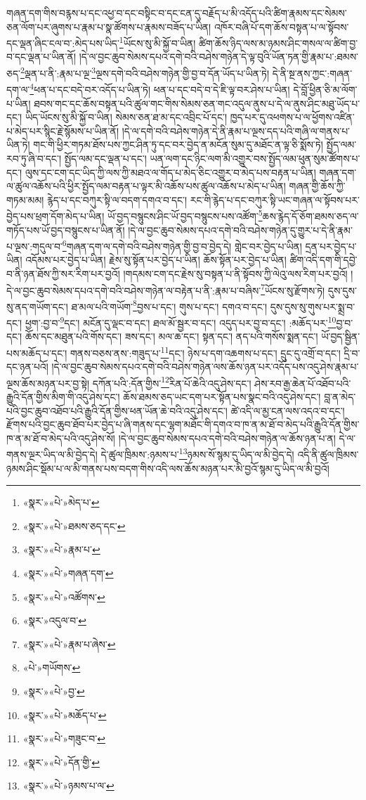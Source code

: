 གཞན་དག་གིས་བརྙས་པ་དང་འཕྱ་བ་དང་བསྟིང་བ་དང་ངན་དུ་བརྗོད་པ་མི་འདོད་པའི་ཚིག་རྣམས་དང་སེམས་ཅན་ལོག་པར་ཞུགས་པ་རྣམ་པ་སྣ་ཚོགས་པ་རྣམས་བཟོད་པ་ཡིན། འཁོར་བཞི་པོ་དག་ཆོས་བསྟན་པ་ལ་སྟོབས་དང་ལྡན་ཞིང་ངལ་བ་:མེད་པས་ཡིད་\footnote{«སྣར་»«པེ་»མེད་པ་}ཡོངས་སུ་མི་སྐྱོ་བ་ཡིན། ཚིག་ཆོས་ཉིད་ལས་མ་ཉམས་ཤིང་གསལ་ལ་ཚིག་བྱ་བ་དང་ལྡན་པ་ཡིན་ནོ། །དེ་ལ་བྱང་ཆུབ་སེམས་དཔའ་དགེ་བའི་བཤེས་གཉེན་དེ་ལྟ་བུའི་ཡོན་ཏན་གྱི་རྣམ་པ་:ཐམས་ཅད་\footnote{«སྣར་»«པེ་»ཐམས་ཅད་དང་}ལྡན་པ་ནི་:རྣམ་པ་ལྔ་\footnote{«སྣར་»«པེ་»རྣམ་པ་}ལྔས་དགེ་བའི་བཤེས་གཉེན་གྱི་བྱ་བ་དོན་ཡོད་པ་ཡིན་ཏེ། དེ་ནི་སྔ་ནས་ཀྱང་:གཞན་དག་ལ་\footnote{«སྣར་»«པེ་»གཞན་དག་}ཕན་པ་དང་བདེ་བར་འདོད་པ་ཡིན་ཏེ། ཕན་པ་དང་བདེ་བ་དེ་ཇི་ལྟ་བར་ཤེས་པ་ཡིན། དེ་བློ་ཕྱིན་ཅི་མ་ལོག་པ་ཡིན། ཐབས་གང་དང་ཆོས་བསྟན་པའི་ཚུལ་གང་གིས་སེམས་ཅན་གང་འདུལ་ནུས་པ་དེ་ལ་ནུས་ཤིང་མཐུ་ཡོད་པ་དང་། ཡིད་ཡོངས་སུ་མི་སྐྱོ་བ་ཡིན། སེམས་ཅན་ཐ་མ་དང་འབྲིང་པོ་དང་། ཁྱད་པར་དུ་འཕགས་པ་ལ་ཕྱོགས་འཛིན་པ་མེད་པར་སྙིང་རྗེ་སྙོམས་པ་ཡིན་ནོ། །དེ་ལ་དགེ་བའི་བཤེས་གཉེན་དེ་ནི་རྣམ་པ་ལྔས་དད་པའི་གཞི་ལ་གནས་པ་ཡིན་ཏེ། གང་གི་ཕྱིར་གཏམ་ཐོས་པས་ཀྱང་ཤིན་ཏུ་དང་བར་བྱེད་ན་མངོན་སུམ་དུ་མཐོང་ན་ལྟ་ཅི་སྨོས་ཏེ། སྤྱོད་ལམ་རབ་ཏུ་ཞི་བ་དང་། སྤྱོད་ལམ་དང་ལྡན་པ་དང་། ཡན་ལག་དང་ཉིང་ལག་མི་འགྱུར་བས་སྤྱོད་ལམ་ཕུན་སུམ་ཚོགས་པ་དང་། ལུས་དང་ངག་དང་ཡིད་ཀྱི་ལས་ཀྱི་མཐའ་ལ་གོད་པ་མེད་ཅིང་འགྱུར་བ་མེད་པས་བརྟན་པ་ཡིན། གཞན་དག་ལ་ཚུལ་འཆོས་པའི་ཕྱིར་སྤྱོད་ལམ་བརྟན་པ་ལྟར་མི་འཆོས་པས་ཚུལ་འཆོས་པ་མེད་པ་ཡིན། གཞན་གྱི་ཆོས་ཀྱི་གཏམ་མམ། རྙེད་པ་དང་བཀུར་སྟི་ལ་བདག་དགའ་བ་དང་། རང་གི་རྙེད་པ་དང་བཀུར་སྟི་ཡང་གཞན་ལ་སྟོབས་པར་བྱེད་པས་ཕྲག་དོག་མེད་པ་ཡིན། ཡོ་བྱད་བསྙུངས་ཤིང་ཡོ་བྱད་བསྙུངས་པས་འཚོག་\footnote{«སྣར་»«པེ་»འཚོགས་}ཆས་རྙེད་དོ་ཅོག་ཐམས་ཅད་ལ་གཏོད་པས་ཡོ་བྱད་བསྙུངས་པ་ཡིན་ནོ། །དེ་ལ་བྱང་ཆུབ་སེམས་དཔའ་དགེ་བའི་བཤེས་གཉེན་དུ་གྱུར་པ་དེ་ནི་རྣམ་པ་ལྔས་:གདུལ་བ་\footnote{«སྣར་»འདུལ་བ་}གཞན་དག་ལ་དགེ་བའི་བཤེས་གཉེན་གྱི་བྱ་བ་བྱེད་དེ། གླེང་བར་བྱེད་པ་ཡིན། དྲན་པར་བྱེད་པ་ཡིན། འདོམས་པར་བྱེད་པ་ཡིན། རྗེས་སུ་སྟོན་པར་བྱེད་པ་ཡིན། ཆོས་སྟོན་པར་བྱེད་པ་ཡིན། ཚིག་འདི་དག་གི་དབྱེ་བ་ནི་ཉན་ཐོས་ཀྱི་སར་རིག་པར་བྱའོ། །གདམས་ངག་དང་རྗེས་སུ་བསྟན་པ་ནི་སྟོབས་ཀྱི་ལེའུ་ལས་རིག་པར་བྱའོ། །དེ་ལ་བྱང་ཆུབ་སེམས་དཔའ་དགེ་བའི་བཤེས་གཉེན་ལ་བརྟེན་པ་ནི་:རྣམ་པ་བཞིས་\footnote{«སྣར་»«པེ་»རྣམ་པ་ཞེས་}ཡོངས་སུ་རྫོགས་ཏེ། དུས་དུས་སུ་ནད་གཡོག་དང་། ཐ་མལ་པའི་གཡོག་\footnote{«པེ་»གཡོགས་}བྱས་པ་དང་། གུས་པ་དང་། དགའ་བ་དང་། དུས་དུས་སུ་གུས་པར་སྨྲ་བ་དང་། ཕྱག་:བྱ་བ་\footnote{«སྣར་»«པེ་»བྱ་}དང་། མངོན་དུ་ལྡང་བ་དང་། ཐལ་མོ་སྦྱར་བ་དང་། འདུད་པར་བྱ་བ་དང་། :མཆོད་པར་\footnote{«སྣར་»«པེ་»མཆོད་པ་}བྱ་བ་དང་། ཆོས་དང་མཐུན་པའི་གོས་དང་། ཟས་དང་། མལ་ཆ་དང་། སྟན་དང་། ནད་པའི་གསོས་སྨན་དང་། ཡོ་བྱད་སྦྱིན་པས་མཆོད་པ་དང་། གནས་བཅས་ནས་:གཟུད་པ་\footnote{«སྣར་»«པེ་»གཟུང་བ་}དང་། ཉེས་པ་དག་འཆགས་པ་དང་། དྲུང་དུ་འགྲོ་བ་དང་། དྲི་བ་དང་ཉན་པའོ། །དེ་ལ་བྱང་ཆུབ་སེམས་དཔའ་དགེ་བའི་བཤེས་གཉེན་ལས་ཆོས་ཉན་པར་འདོད་པས་འདུ་ཤེས་རྣམ་པ་ལྔས་ཆོས་མཉན་པར་བྱ་སྟེ། དཀོན་པའི་:དོན་གྱིས་\footnote{«སྣར་»«པེ་»དོན་གྱི་}རིན་པོ་ཆེའི་འདུ་ཤེས་དང་། ཤེས་རབ་རྒྱ་ཆེན་པོ་འཐོབ་པའི་རྒྱུའི་དོན་གྱིས་མིག་གི་འདུ་ཤེས་དང་། ཆོས་ཐམས་ཅད་ཡང་དག་པར་སྟོན་པས་སྣང་བའི་འདུ་ཤེས་དང་། བླ་ན་མེད་པའི་བྱང་ཆུབ་འཐོབ་པའི་རྒྱུའི་དོན་གྱིས་ཕན་ཡོན་ཆེ་བའི་འདུ་ཤེས་དང་། ཚེ་འདི་ལ་མྱ་ངན་ལས་འདའ་བ་དང་། རྫོགས་པའི་བྱང་ཆུབ་ཐོབ་པར་བྱེད་པ་ཞི་གནས་དང་ལྷག་མཐོང་གི་དགའ་བ་ཁ་ན་མ་ཐོ་བ་མེད་པའི་རྒྱུའི་དོན་གྱིས་ཁ་ན་མ་ཐོ་བ་མེད་པའི་འདུ་ཤེས་སོ། །དེ་ལ་བྱང་ཆུབ་སེམས་དཔའ་དགེ་བའི་བཤེས་གཉེན་ལ་ཆོས་ཉན་པ་ན། དེ་ལ་གནས་ལྔར་ཡིད་ལ་མི་བྱེད་དེ། དེ་ཚུལ་ཁྲིམས་:ཉམས་པ་\footnote{«སྣར་»«པེ་»ཉམས་པ་ལ་}ཉམས་སོ་སྙམ་དུ་ཡིད་ལ་མི་བྱེད་དེ། འདི་ནི་ཚུལ་ཁྲིམས་ཉམས་ཤིང་སྡོམ་པ་ལ་མི་གནས་པས་བདག་གིས་འདི་ལས་ཆོས་མཉན་པར་མི་བྱའོ་སྙམ་དུ་ཡིད་ལ་མི་བྱའོ། 